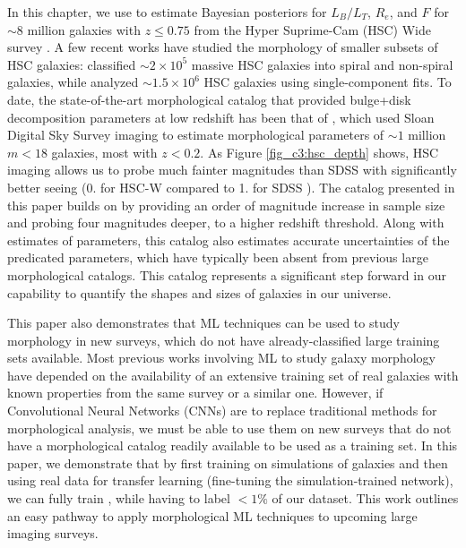 In this chapter, we use \gampen{} to estimate Bayesian posteriors for $L_B/L_T$, $R_e$, and $F$ for $\sim 8$ million galaxies with $z \leq 0.75$ from the Hyper Suprime-Cam (HSC) Wide survey \citep{hsc_design}. A few recent works have studied the morphology of smaller subsets of HSC galaxies: \citet{hsc_morph_den} classified $\sim2\times10^5$ massive HSC galaxies into spiral and non-spiral galaxies, while \citet{hsc_mass_size} analyzed $\sim1.5\times10^6$ HSC galaxies using single-component \sersic{} fits. To date, the state-of-the-art morphological catalog that provided bulge+disk decomposition parameters at low redshift has been that of \citet{simard_11}, which used Sloan Digital Sky Survey \citep[SDSS; ][]{sdss_tech_summary} imaging to estimate morphological parameters of $\sim1$ million $m < 18$ galaxies, most with $z < 0.2$. As Figure \ref{fig_c3:hsc_depth} shows, HSC imaging allows us to probe much fainter magnitudes than SDSS with significantly better seeing (0. for HSC-W \gb{} compared to 1. for SDSS \gb{}). The catalog presented in this paper builds on \citet{simard_11} by providing an order of magnitude increase in sample size and probing four magnitudes deeper, to a higher redshift threshold. Along with estimates of parameters, this catalog also estimates accurate uncertainties of the predicated parameters, which have typically been absent from previous large morphological catalogs. This catalog represents a significant step forward in our capability to quantify the shapes and sizes of galaxies in our universe. 


This paper also demonstrates that ML techniques can be used to study morphology in new surveys, which do not have already-classified large training sets available. Most previous works involving ML to study galaxy morphology have depended on the availability of an extensive training set of real galaxies with known properties from the same survey or a similar one. However, if Convolutional Neural Networks (CNNs) are to replace traditional methods for morphological analysis, we must be able to use them on new surveys that do not have a morphological catalog readily available to be used as a training set. In this paper, we demonstrate that by first training on simulations of galaxies and then using real data for transfer learning (fine-tuning the simulation-trained network), we can fully train \gampen{}, while having to label $<1\%$ of our dataset. This work outlines an easy pathway to apply morphological ML techniques to upcoming large imaging surveys.  

